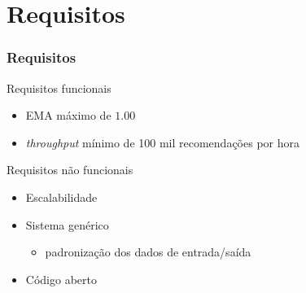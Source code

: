 \section[Requisitos]{Requisitos}
\begin{frame}
\frametitle{Requisitos}
\begin{block}{Requisitos funcionais}
\begin{itemize}
	\item EMA máximo de $1.00$  
	\item \textit{throughput} mínimo de 100 mil recomendações por hora
\end{itemize}
\end{block}

\begin{block}{Requisitos não funcionais}
\begin{itemize}
	\item Escalabilidade
	\item Sistema genérico
	\begin{itemize}
		\item padronização dos dados de entrada/saída
	\end{itemize}
	\item Código aberto
\end{itemize}
\end{block}
\end{frame}
